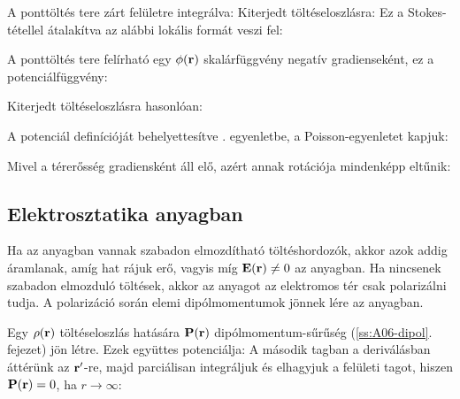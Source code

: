    A ponttöltés tere zárt felületre integrálva:
   Kiterjedt töltéseloszlásra:
   Ez a Stokes-tétellel átalakítva az alábbi lokális formát veszi fel:
   
   A ponttöltés tere felírható egy $\phi(\mathbf{r})$ skalárfüggvény negatív gradienseként, ez a potenciálfüggvény:
   
   Kiterjedt töltéseloszlásra hasonlóan:
   
   A potenciál definícióját behelyettesítve . egyenletbe, a Poisson-egyenletet kapjuk:
   
   Mivel a térerősség gradiensként áll elő, azért annak rotációja mindenképp eltűnik:
   
  \subsection{Elektrosztatika anyagban}\label{ss1:elsztat}
   
   Ha az anyagban vannak szabadon elmozdítható töltéshordozók, akkor azok addig áramlanak, amíg hat rájuk erő, vagyis míg $\mathbf{E}(\mathbf{r})\ne 0$ az anyagban. Ha nincsenek szabadon elmozduló töltések, akkor az anyagot az elektromos tér csak polarizálni tudja. A polarizáció során elemi dipólmomentumok jönnek lére az anyagban. 
   
   Egy $\rho(\mathbf{r})$ töltéseloszlás  hatására $\mathbf{P}(\mathbf{r})$ dipólmomentum-sűrűség (\ref{ss:A06-dipol}. fejezet) jön létre. Ezek együttes potenciálja:
   A második tagban a deriválásban áttérünk az $\mathbf{r}'$-re, majd parciálisan integráljuk és elhagyjuk a felületi tagot, hiszen $\mathbf{P}(\mathbf{r})=0$, ha $r\to\infty$:
   
